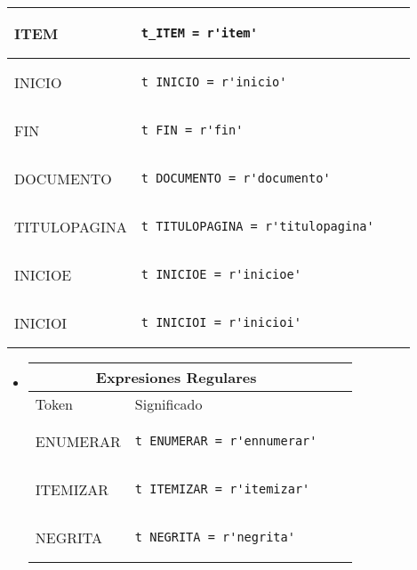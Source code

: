 \documentclass[12pt]{article}
\begin{document}
\begin{enumerate}
\begin{itemize}
\begin{tabular}{ |p{6cm}||p{8cm}|p{3cm}|p{3cm}|  }
            \hline ITEM & \begin{verbatim}t_ITEM = r'item'\end{verbatim} \\
            \hline INICIO & \begin{verbatim}t_INICIO = r'inicio'\end{verbatim} \\
            \hline FIN & \begin{verbatim}t_FIN = r'fin'\end{verbatim} \\
            \hline DOCUMENTO & \begin{verbatim}t_DOCUMENTO = r'documento'\end{verbatim} \\
            \hline TITULOPAGINA & \begin{verbatim}t_TITULOPAGINA = r'titulopagina'\end{verbatim} \\
            \hline INICIOE & \begin{verbatim}t_INICIOE = r'inicioe'\end{verbatim} \\
            \hline INICIOI & \begin{verbatim}t_INICIOI = r'inicioi'\end{verbatim} \\
            \hline
            \end{tabular}
        \end{itemize}
        \begin{itemize}
            \item \begin{tabular}{ |p{6cm}||p{8cm}|p{3cm}|p{3cm}|  }
            \hline
            \multicolumn{2}{|c|}{Expresiones Regulares} \\
            \hline  Token& Significado\\ 
            \hline
            \hline ENUMERAR & \begin{verbatim}t_ENUMERAR = r'ennumerar'\end{verbatim} \\
            \hline ITEMIZAR & \begin{verbatim}t_ITEMIZAR = r'itemizar'\end{verbatim} \\
            \hline NEGRITA & \begin{verbatim}t_NEGRITA = r'negrita'\end{verbatim} \\

\end{tabular}
\end{itemize}
\end{enumerate}
\end{document}
